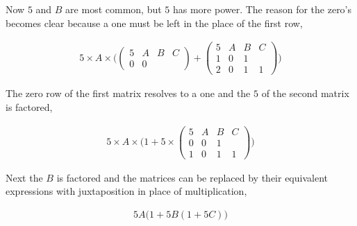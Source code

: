 Now $5$ and $B$ are most common, but $5$ has more power. The reason for the zero's becomes clear because a one must be left in the place of the first row,

\begin{align*}
5 \times A \times \Big(
\begin{pmatrix}5 & A & B & C\\
               0 & 0 &   &  \end{pmatrix}
+
\begin{pmatrix}5 & A & B & C\\
               1 & 0 & 1 &  \\
               2 & 0 & 1 & 1\end{pmatrix}
\Big)
\end{align*}

The zero row of the first matrix resolves to a one and the $5$ of the second matrix is factored,

\begin{align*}
5 \times A \times \Big(1 
+ 5 \times 
\begin{pmatrix}5 & A & B & C\\
               0 & 0 & 1 &  \\
               1 & 0 & 1 & 1\end{pmatrix}
\Big)
\end{align*}

Next the $B$ is factored and the matrices can be replaced by their equivalent expressions with juxtaposition in place of multiplication,

\begin{align*}
5A \Big(1 + 5B(1 + 5C)\Big)
\end{align*}

